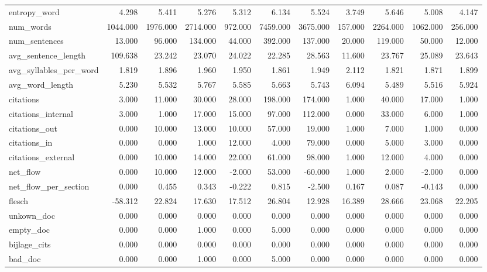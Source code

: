 \begin{tabular}{lrrrrrrrrrr}
\cline{1-11}
entropy\_word & 4.298 & 5.411 & 5.276 & 5.312 & 6.134 & 5.524 & 3.749 & 5.646 & 5.008 & 4.147 \\
\cline{1-11}
num\_words & 1044.000 & 1976.000 & 2714.000 & 972.000 & 7459.000 & 3675.000 & 157.000 & 2264.000 & 1062.000 & 256.000 \\
\cline{1-11}
num\_sentences & 13.000 & 96.000 & 134.000 & 44.000 & 392.000 & 137.000 & 20.000 & 119.000 & 50.000 & 12.000 \\
\cline{1-11}
avg\_sentence\_length & 109.638 & 23.242 & 23.070 & 24.022 & 22.285 & 28.563 & 11.600 & 23.767 & 25.089 & 23.643 \\
\cline{1-11}
avg\_syllables\_per\_word & 1.819 & 1.896 & 1.960 & 1.950 & 1.861 & 1.949 & 2.112 & 1.821 & 1.871 & 1.899 \\
\cline{1-11}
avg\_word\_length & 5.230 & 5.532 & 5.767 & 5.585 & 5.663 & 5.743 & 6.094 & 5.489 & 5.516 & 5.924 \\
\cline{1-11}
citations & 3.000 & 11.000 & 30.000 & 28.000 & 198.000 & 174.000 & 1.000 & 40.000 & 17.000 & 1.000 \\
\cline{1-11}
citations\_internal & 3.000 & 1.000 & 17.000 & 15.000 & 97.000 & 112.000 & 0.000 & 33.000 & 6.000 & 1.000 \\
\cline{1-11}
citations\_out & 0.000 & 10.000 & 13.000 & 10.000 & 57.000 & 19.000 & 1.000 & 7.000 & 1.000 & 0.000 \\
\cline{1-11}
citations\_in & 0.000 & 0.000 & 1.000 & 12.000 & 4.000 & 79.000 & 0.000 & 5.000 & 3.000 & 0.000 \\
\cline{1-11}
citations\_external & 0.000 & 10.000 & 14.000 & 22.000 & 61.000 & 98.000 & 1.000 & 12.000 & 4.000 & 0.000 \\
\cline{1-11}
net\_flow & 0.000 & 10.000 & 12.000 & -2.000 & 53.000 & -60.000 & 1.000 & 2.000 & -2.000 & 0.000 \\
\cline{1-11}
net\_flow\_per\_section & 0.000 & 0.455 & 0.343 & -0.222 & 0.815 & -2.500 & 0.167 & 0.087 & -0.143 & 0.000 \\
\cline{1-11}
flesch & -58.312 & 22.824 & 17.630 & 17.512 & 26.804 & 12.928 & 16.389 & 28.666 & 23.068 & 22.205 \\
\cline{1-11}
unkown\_doc & 0.000 & 0.000 & 0.000 & 0.000 & 0.000 & 0.000 & 0.000 & 0.000 & 0.000 & 0.000 \\
\cline{1-11}
empty\_doc & 0.000 & 0.000 & 1.000 & 0.000 & 5.000 & 0.000 & 0.000 & 0.000 & 0.000 & 0.000 \\
\cline{1-11}
bijlage\_cits & 0.000 & 0.000 & 0.000 & 0.000 & 0.000 & 0.000 & 0.000 & 0.000 & 0.000 & 0.000 \\
\cline{1-11}
bad\_doc & 0.000 & 0.000 & 1.000 & 0.000 & 5.000 & 0.000 & 0.000 & 0.000 & 0.000 & 0.000 \\
\cline{1-11}
\bottomrule
\end{tabular}
